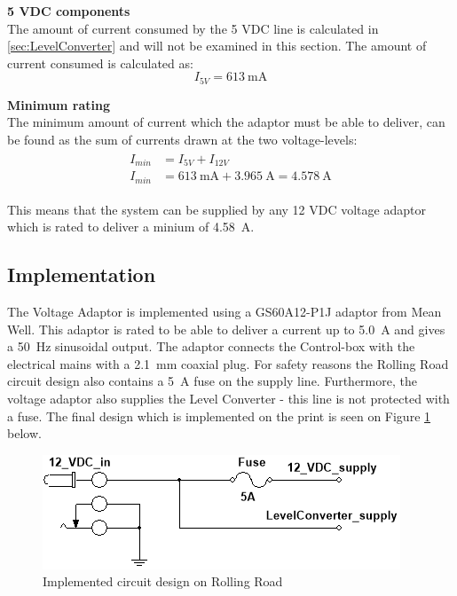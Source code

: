 \textbf{5 VDC components}\\
The amount of current consumed by the 5 VDC line is calculated in \vref{sec:LevelConverter} and will not be examined in this section. The amount of current consumed is calculated as:
\begin{equation}
	I_{5V} = \SI{613}{\milli \ampere}
\end{equation}

\textbf{Minimum rating}\\
The minimum amount of current which the adaptor must be able to deliver, can be found as the sum of currents drawn at the two voltage-levels:
\begin{align}
	\begin{split}
		I_{min} &= I_{5V} + I_{12V}\\
		I_{min} &= \SI{613}{\milli \ampere} + \SI{3.965}{\ampere} = \SI{4.578}{\ampere}
	\end{split}
\end{align}

This means that the system can be supplied by any 12 VDC voltage adaptor which is rated to deliver a minium of \SI{4.58}{\ampere}.

\subsection{Implementation}
The Voltage Adaptor is implemented using a GS60A12-P1J adaptor from Mean Well. This adaptor is rated to be able to deliver a current up to \SI{5.0}{\ampere} and gives a \SI{50}{\hertz} sinusoidal output. The adaptor connects the Control-box with the electrical mains with a \SI{2.1}{\milli \meter} coaxial plug. For safety reasons the Rolling Road circuit design also contains a \SI{5}{\ampere} fuse on the supply line. Furthermore, the voltage adaptor also supplies the Level Converter - this line is not protected with a fuse. The final design which is implemented on the print is seen on Figure \ref{fig:DesignVoltageAdaptor} below.

\begin{figure}[H]
	\centering
	\includegraphics[width=0.5\linewidth]{Hardware/Pictures/DesignVoltageAdaptor}
	\caption{Implemented circuit design on Rolling Road}
	\label{fig:DesignVoltageAdaptor}
\end{figure}

